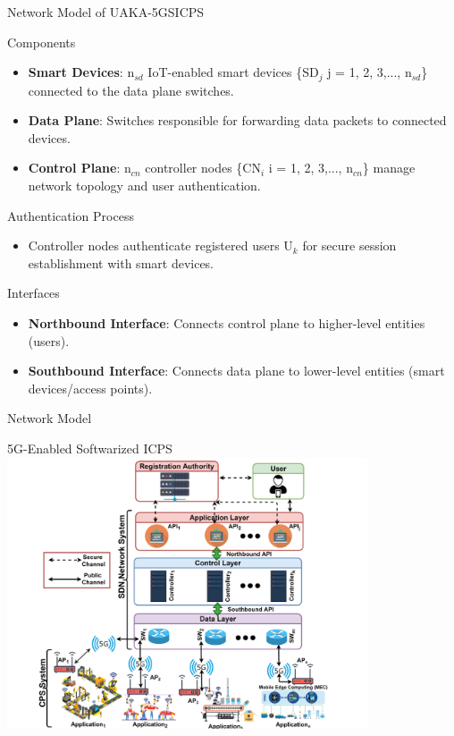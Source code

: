 \documentclass[9pt,handout]{beamer}
\begin{document}
\begin{frame}{Network Model of UAKA-5GSICPS}

\begin{block}{Components}
    \begin{itemize}
        \item \textbf{Smart Devices}: n\(_{sd}\) IoT-enabled smart devices \{SD\(_j\) \mid j = 1, 2, 3,..., n\(_{sd}\)\} connected to the data plane switches.
        \item \textbf{Data Plane}: Switches responsible for forwarding data packets to connected devices.
        \item \textbf{Control Plane}: n\(_{cn}\) controller nodes \{CN\(_i\) \mid i = 1, 2, 3,..., n\(_{cn}\)\} manage network topology and user authentication.
    \end{itemize}
\end{block}

\begin{block}{Authentication Process}
    \begin{itemize}
        \item Controller nodes authenticate registered users U\(_k\) for secure session establishment with smart devices.
    \end{itemize}
\end{block}

\begin{block}{Interfaces}
    \begin{itemize}
        \item \textbf{Northbound Interface}: Connects control plane to higher-level entities (users).
        \item \textbf{Southbound Interface}: Connects data plane to lower-level entities (smart devices/access points).
    \end{itemize}
\end{block}

\end{frame}

\begin{frame}{Network Model}

\begin{block}{5G-Enabled Softwarized ICPS}
    \centering
    \includegraphics[width=0.8\textwidth]{model.png} %
    \caption{\\Network Model of the proposed scheme.}
\end{block}

\end{frame}
\end{document}
